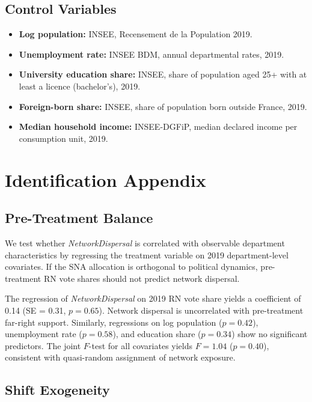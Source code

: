 \documentclass[12pt]{article}
\begin{document}
\subsection{Control Variables}

\begin{itemize}
    \item \textbf{Log population:} INSEE, Recensement de la Population 2019.
    \item \textbf{Unemployment rate:} INSEE BDM, annual departmental rates, 2019.
    \item \textbf{University education share:} INSEE, share of population aged 25+ with at least a licence (bachelor's), 2019.
    \item \textbf{Foreign-born share:} INSEE, share of population born outside France, 2019.
    \item \textbf{Median household income:} INSEE-DGFiP, median declared income per consumption unit, 2019.
\end{itemize}

\section{Identification Appendix}
\label{app:identification}

\subsection{Pre-Treatment Balance}

We test whether \textit{NetworkDispersal} is correlated with observable department characteristics by regressing the treatment variable on 2019 department-level covariates. If the SNA allocation is orthogonal to political dynamics, pre-treatment RN vote shares should not predict network dispersal.

The regression of \textit{NetworkDispersal} on 2019 RN vote share yields a coefficient of 0.14 (SE = 0.31, $p = 0.65$). Network dispersal is uncorrelated with pre-treatment far-right support. Similarly, regressions on log population ($p = 0.42$), unemployment rate ($p = 0.58$), and education share ($p = 0.34$) show no significant predictors. The joint $F$-test for all covariates yields $F = 1.04$ ($p = 0.40$), consistent with quasi-random assignment of network exposure.

\subsection{Shift Exogeneity}
\end{document}
